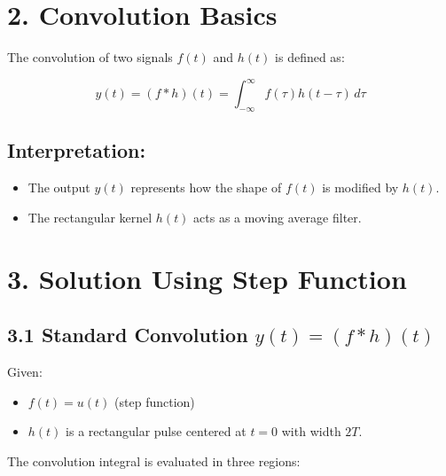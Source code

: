 \documentclass[12pt,a4paper,titlepage]{article}
\begin{document}
\section*{2. Convolution Basics}

The convolution of two signals \( f(t) \) and \( h(t) \) is defined as:

\begin{equation}
y(t) = (f * h)(t) = \int_{-\infty}^{\infty} f(\tau) h(t - \tau) \, d\tau
\end{equation}

\subsection*{Interpretation:}
\begin{itemize}
    \item The output \( y(t) \) represents how the shape of \( f(t) \) is modified by \( h(t) \).
    \item The rectangular kernel \( h(t) \) acts as a moving average filter.
\end{itemize}

\section*{3. Solution Using Step Function}

\subsection*{3.1 Standard Convolution \( y(t) = (f * h)(t) \)}

Given:
\begin{itemize}
    \item \( f(t) = u(t) \) (step function)
    \item \( h(t) \) is a rectangular pulse centered at \( t = 0 \) with width \( 2T \).
\end{itemize}

The convolution integral is evaluated in three regions:
\end{document}
